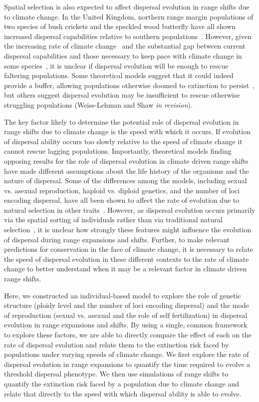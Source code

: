 \documentclass[11pt]{article}
\begin{document}
Spatial selection is also expected to affect dispersal evolution in range shifts due to climate change. In the United Kingdom, northern range margin populations of two species of bush crickets and the speckled wood butterfly have all shown increased dispersal capabilities relative to southern populations~\citep{hill1999flight, thomas2001ecological}. However, given the increasing rate of climate change~\citep{chen2017increasing} and the substantial gap between current dispersal capabilities and those necessary to keep pace with climate change in some species~\citep{schloss2012dispersal}, it is unclear if dispersal evolution will be enough to rescue faltering populations. Some theoretical models suggest that it could indeed provide a buffer, allowing populations otherwise doomed to extinction to persist~\citep{boeye2013more}, but others suggest dispersal evolution may be insufficient to rescue otherwise struggling populations (Weiss-Lehman and Shaw \textit{in revision}).

The key factor likely to determine the potential role of dispersal evolution in range shifts due to climate change is the speed with which it occurs. If evolution of dispersal ability occurs too slowly relative to the speed of climate change it cannot rescue lagging populations. Importantly, theoretical models finding opposing results for the role of dispersal evolution in climate driven range shifts have made different assumptions about the life history of the organisms and the nature of dispersal. Some of the differences among the models, including sexual vs. asexual reproduction, haploid vs. diploid genetics, and the number of loci encoding dispersal, have all been shown to affect the rate of evolution due to natural selection in other traits~\citep{orr1994does, zeyl2003evolutionary, goddard2005sex, pritchard2010genetics}. However, as dispersal evolution occurs primarily via the spatial sorting of individuals rather than via traditional natural selection~\citep{shine2011evolutionary}, it is unclear how strongly these features might influence the evolution of dispersal during range expansions and shifts. Further, to make relevant predictions for conservation in the face of climate change, it is necessary to relate the speed of dispersal evolution in these different contexts to the rate of climate change to better understand when it may be a relevant factor in climate driven range shifts.

Here, we constructed an individual-based model to explore the role of genetic structure (ploidy level and the number of loci encoding dispersal) and the mode of reproduction (sexual vs. asexual and the role of self fertilization) in dispersal evolution in range expansions and shifts. By using a single, common framework to explore these factors, we are able to directly compare the effect of each on the rate of dispersal evolution and relate them to the extinction risk faced by populations under varying speeds of climate change. We first explore the rate of dispersal evolution in range expansions to quantify the time required to evolve a threshold dispersal phenotype. We then use simulations of range shifts to quantify the extinction risk faced by a population due to climate change and relate that directly to the speed with which dispersal ability is able to evolve.
\end{document}
